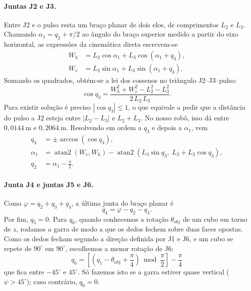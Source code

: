 \paragraph{Juntas J2 e J3.} Entre J2 e o pulso resta um braço planar de dois elos, de comprimentos $L_2$ e $L_3$. Chamando $\alpha_1=q_2+\pi/2$ ao ângulo do braço superior medido a partir do eixo horizontal, as expressões da cinemática direta escrevem-se
\begin{align*}
W_h &= L_2\cos\alpha_1 + L_3\cos(\alpha_1+q_3),\\
W_v &= L_2\sin\alpha_1 + L_3\sin(\alpha_1+q_3).
\end{align*}
Somando os quadrados, obtém-se a lei dos cossenos no triângulo J2--J3--pulso:
\begin{equation*}
\cos q_3=\frac{W_h^2+W_v^2-L_2^2-L_3^2}{2\,L_2\,L_3}.
\end{equation*}
Para existir solução é preciso $|\cos q_3|\le 1$, o que equivale a pedir que a distância do pulso a J2 esteja entre $|L_2-L_3|$ e $L_2+L_3$. No nosso robô, isso dá entre $0{,}0144~\mathrm{m}$ e $0{,}2064~\mathrm{m}$. Resolvendo em ordem a $q_3$ e depois a $\alpha_1$, vem
\begin{align*}
q_3 &= \pm\arccos\!\left(\cos q_3\right),\\
\alpha_1 &= \operatorname{atan2}(W_v,W_h)-\operatorname{atan2}\!\left(L_3\sin q_3,\;L_2+L_3\cos q_3\right),\\
q_2 &= \alpha_1-\frac{\pi}{2}.
\end{align*}

\paragraph{Junta J4 e juntas J5 e J6.} Como $\varphi=q_2+q_3+q_4$, a última junta do braço planar é
\begin{equation*}
q_4=\varphi-q_2-q_3.
\end{equation*}
Por fim, $q_5=0$. Para $q_6$, quando conhecemos a rotação $\theta_{obj}$ de um cubo em torno de $z$, rodamos a garra de modo a que os dedos fechem sobre duas faces opostas. Como os dedos fecham segundo a direção definida por J1 e J6, e um cubo se repete de $90^\circ$ em $90^\circ$, escolhemos a menor rotação de J6:
\begin{equation*}
q_6 = \left[\left(q_1 - \theta_{\text{obj}} + \frac{\pi}{4}\right) \bmod \frac{\pi}{2}\right] - \frac{\pi}{4}\end{equation*}
que fica entre $-45^\circ$ e $45^\circ$. Só fazemos isto se a garra estiver quase vertical ($\psi>45^\circ$); caso contrário, $q_6=0$.

